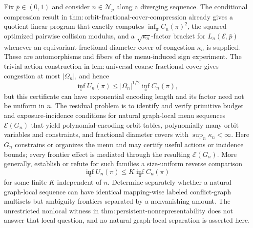 Fix \(\bar p\in(0,1)\) and consider \(n\in\mathcal N_{\bar p}\) along a diverging sequence. The conditional compression result in \(\mathrm{thm{:}orbit\text{-}fractional\text{-}cover\text{-}compression}\) already gives a quotient linear program that exactly computes \(\inf_\pi C_n(\pi)^2\), the squared optimized pairwise collision modulus, and a \(\sqrt{\kappa_n}\)-factor bracket for \(L_n(\mathcal E,\bar p)\) whenever an equivariant fractional diameter cover of congestion \(\kappa_n\) is supplied. These are automorphisms and fibers of the menu-induced sign experiment. The trivial-action construction in \(\mathrm{lem{:}universal\text{-}coarse\text{-}fractional\text{-}cover}\) gives congestion at most \(|\Omega_n|\), and hence
\[
 \inf_\pi U_n(\pi)
 \le |\Omega_n|^{1/2}\inf_\pi C_n(\pi),
\]
but this certificate can have exponential encoding length and its factor need not be uniform in \(n\). The residual problem is to identify and verify primitive budget and exposure-incidence conditions for natural graph-local menu sequences \(\mathcal E(G_n)\) that yield polynomial-encoding orbit tables, polynomially many orbit variables and constraints, and fractional diameter covers with \(\sup_n\kappa_n<\infty\). Here \(G_n\) constrains or organizes the menu and may certify useful actions or incidence bounds; every frontier effect is mediated through the resulting \(\mathcal E(G_n)\). More generally, establish or refute for such families a size-uniform reverse comparison
\[
 \inf_\pi U_n(\pi)\le K\inf_\pi C_n(\pi)
\]
for some finite \(K\) independent of \(n\). Determine separately whether a natural graph-local sequence can have identical mapping-wise labeled conflict-graph multisets but ambiguity frontiers separated by a nonvanishing amount. The unrestricted nonlocal witness in \(\mathrm{thm{:}persistent\text{-}nonrepresentability}\) does not answer that local question, and no natural graph-local separation is asserted here.
